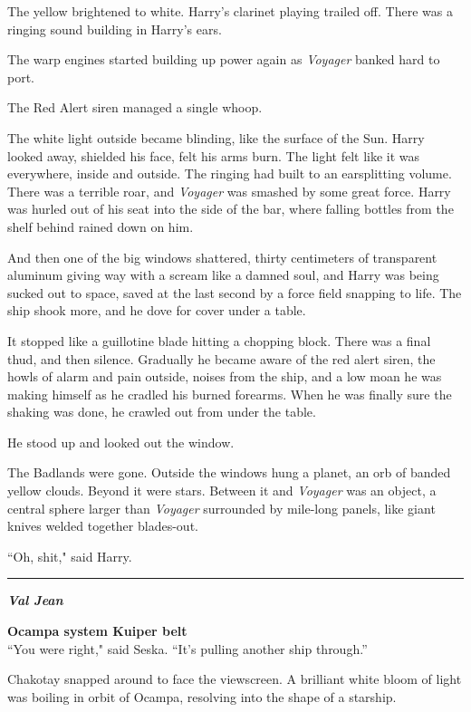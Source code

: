 \documentclass[twoside,letterpaper,12pt]{memoir}
\begin{document}
The yellow brightened to white. Harry’s clarinet playing trailed off. There was a ringing sound building in Harry's ears.

The warp engines started building up power again as \textit{Voyager }banked hard to port.

The Red Alert siren managed a single whoop.

The white light outside became blinding, like the surface of the Sun. Harry looked away, shielded his face, felt his arms burn. The light felt like it was everywhere, inside and outside. The ringing had built to an earsplitting volume. There was a terrible roar, and \textit{Voyager} was smashed by some great force. Harry was hurled out of his seat into the side of the bar, where falling bottles from the shelf behind rained down on him.

And then one of the big windows shattered, thirty centimeters of transparent aluminum giving way with a scream like a damned soul, and Harry was being sucked out to space, saved at the last second by a force field snapping to life. The ship shook more, and he dove for cover under a table.

It stopped like a guillotine blade hitting a chopping block. There was a final thud, and then silence. Gradually he became aware of the red alert siren, the howls of alarm and pain outside, noises from the ship, and a low moan he was making himself as he cradled his burned forearms. When he was finally sure the shaking was done, he crawled out from under the table.

He stood up and looked out the window.

The Badlands were gone. Outside the windows hung a planet, an orb of banded yellow clouds. Beyond it were stars. Between it and \textit{Voyager} was an object, a central sphere larger than \textit{Voyager} surrounded by mile-long panels, like giant knives welded together blades-out.

``Oh, shit," said Harry.

\begin{center}\rule{3cm}{0.4 pt}\end{center}

\noindent\textit{\textbf{Val Jean}}

\noindent\textbf{Ocampa system Kuiper belt}\\

``You were right," said Seska. ``It’s pulling another ship through.''

Chakotay snapped around to face the viewscreen. A brilliant white bloom of light was boiling in orbit of Ocampa, resolving into the shape of a starship.
\end{document}
